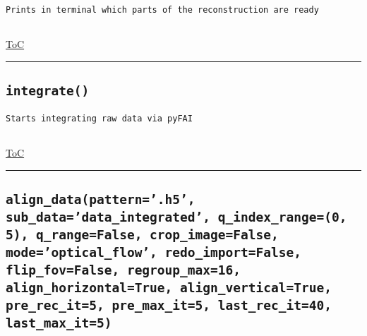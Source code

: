 \documentclass{article}
\begin{document}
\begin{lstlisting}[language=docstring]
Prints in terminal which parts of the reconstruction are ready
    
\end{lstlisting}

\begin{flushright}

\hyperref[toc]{ToC}

\end{flushright}



\vspace{5mm}

\hrule

\subsection*{\texttt{integrate()}}

\begin{lstlisting}[language=docstring]
Starts integrating raw data via pyFAI
    
\end{lstlisting}

\begin{flushright}

\hyperref[toc]{ToC}

\end{flushright}



\vspace{5mm}

\hrule

\subsection*{\texttt{align\_data(pattern='.h5', sub\_data='data\_integrated', q\_index\_range=(0, 5), q\_range=False, crop\_image=False, mode='optical\_flow', redo\_import=False, flip\_fov=False, regroup\_max=16, align\_horizontal=True, align\_vertical=True, pre\_rec\_it=5, pre\_max\_it=5, last\_rec\_it=40, last\_max\_it=5)}}
\end{document}
